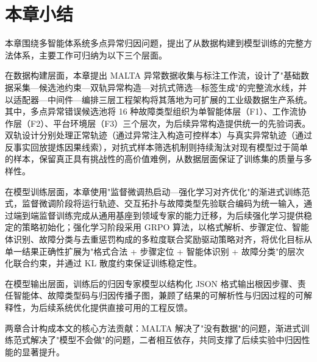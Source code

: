 \section{本章小结}

本章围绕多智能体系统多点异常归因问题，提出了从数据构建到模型训练的完整方法体系，主要工作可归纳为以下三个层面。
 
在数据构建层面，本章提出 MALTA 异常数据收集与标注工作流，设计了"基础数据采集—候选池约束—双轨异常构造—对抗式筛选—标签生成"的完整流水线，并以适配器—中间件—编排三层工程架构将其落地为可扩展的工业级数据生产系统。其中，多点异常错误候选池将 16 种故障类型组织为单智能体层（F1）、工作流协作层（F2）、平台环境层（F3）三个层次，为后续异常构造提供统一的先验词表。双轨设计分别处理正常轨迹（通过异常注入构造可控样本）与真实异常轨迹（通过反事实回放提炼因果线索），对抗式样本筛选机制则持续淘汰对现有模型过于简单的样本，保留真正具有挑战性的高价值难例，从数据层面保证了训练集的质量与多样性。
 
在模型训练层面，本章使用"监督微调热启动—强化学习对齐优化"的渐进式训练范式，监督微调阶段将运行轨迹、交互拓扑与故障类型先验联合编码为统一输入，通过端到端监督训练完成从通用基座到领域专家的能力迁移，为后续强化学习提供稳定的策略初始化；强化学习阶段采用 GRPO 算法，以格式解析、步骤定位、智能体识别、故障分类与去重惩罚构成的多粒度联合奖励驱动策略对齐，将优化目标从单一结果正确性扩展为"格式合法 + 步骤定位 + 智能体识别 + 故障分类"的层次化联合约束，并通过 KL 散度约束保证训练稳定性。
 
在模型输出层面，训练后的归因专家模型以结构化 JSON 格式输出根因步骤、责任智能体、故障类型码与归因传播子图，兼顾了结果的可解析性与归因过程的可解释性，为后续系统优化提供直接可用的工程反馈。
 
两章合计构成本文的核心方法贡献：MALTA 解决了"没有数据"的问题，渐进式训练范式解决了"模型不会做"的问题，二者相互依存，共同支撑了后续实验中归因性能的显著提升。
